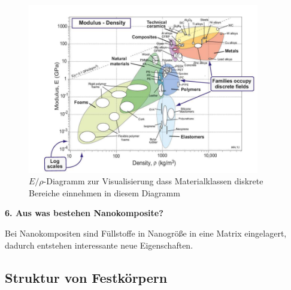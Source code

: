 \begin{figure}[h]
    \centering
    \includegraphics[width = 0.9\textwidth]{images/Materialwissenschaften/E_Dichte_Diagramm.png}
    \caption{$E/\rho$-Diagramm zur Visualisierung dass Materialklassen diskrete Bereiche einnehmen in diesem Diagramm}
    \label{fig:E_Dichte_Diagramm}
\end{figure}

\noindent\textbf{6. Aus was bestehen Nanokomposite?}\\
\begin{addmargin}[25pt]{0pt}
Bei Nanokompositen sind Füllstoffe in Nanogröße in eine Matrix eingelagert, dadurch entstehen interessante neue Eigenschaften.\\
\end{addmargin} 

\newpage
\subsection{Struktur von Festkörpern}

